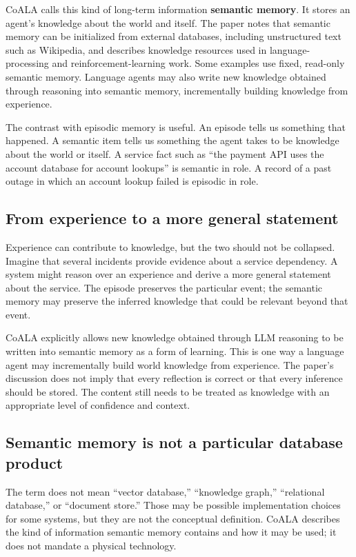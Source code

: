 CoALA calls this kind of long-term information \textbf{semantic memory}. It stores an agent's knowledge about the world and itself. The paper notes that semantic memory can be initialized from external databases, including unstructured text such as Wikipedia, and describes knowledge resources used in language-processing and reinforcement-learning work. Some examples use fixed, read-only semantic memory. Language agents may also write new knowledge obtained through reasoning into semantic memory, incrementally building knowledge from experience.

The contrast with episodic memory is useful. An episode tells us something that happened. A semantic item tells us something the agent takes to be knowledge about the world or itself. A service fact such as ``the payment API uses the account database for account lookups'' is semantic in role. A record of a past outage in which an account lookup failed is episodic in role.

\subsection{From experience to a more general statement}

Experience can contribute to knowledge, but the two should not be collapsed. Imagine that several incidents provide evidence about a service dependency. A system might reason over an experience and derive a more general statement about the service. The episode preserves the particular event; the semantic memory may preserve the inferred knowledge that could be relevant beyond that event.

CoALA explicitly allows new knowledge obtained through LLM reasoning to be written into semantic memory as a form of learning. This is one way a language agent may incrementally build world knowledge from experience. The paper's discussion does not imply that every reflection is correct or that every inference should be stored. The content still needs to be treated as knowledge with an appropriate level of confidence and context.

\subsection{Semantic memory is not a particular database product}

The term does not mean ``vector database,'' ``knowledge graph,'' ``relational database,'' or ``document store.'' Those may be possible implementation choices for some systems, but they are not the conceptual definition. CoALA describes the kind of information semantic memory contains and how it may be used; it does not mandate a physical technology.

